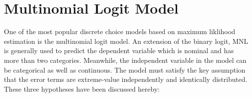 \documentclass[a4paper,11pt]{article}
\begin{document}
\clearpage

\section{Multinomial Logit Model}
\label{sec:MNL}

    One of the most popular discrete choice models based on maximum liklihood estimation is the multinomial logit model. An extension of the binary logit, MNL is generally used to predict the dependent variable which is nominal and has more than two categories. Meanwhile, the independent variable in the model can be categorical as well as continuous. The model must satisfy the key assumption that the error terms are extreme-value independently and identically distributed. These three hypotheses have been discussed hereby:
\end{document}
